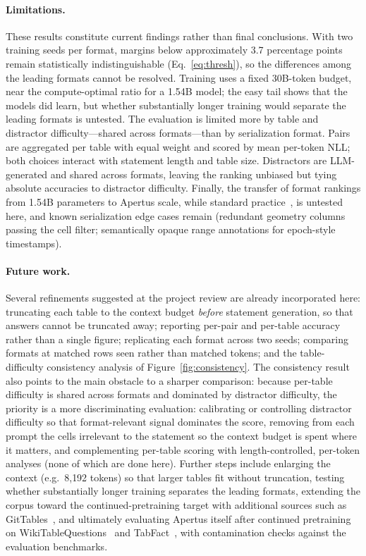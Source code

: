 \documentclass[11pt,a4paper]{article}
\begin{document}
\paragraph{Limitations.} These results constitute current findings rather than final conclusions. With two training seeds per format, margins below approximately 3.7 percentage points remain statistically indistinguishable (Eq.~\eqref{eq:thresh}), so the differences among the leading formats cannot be resolved. Training uses a fixed 30B-token budget, near the compute-optimal ratio for a 1.54B model; the easy tail shows that the models did learn, but whether substantially longer training would separate the leading formats is untested. The evaluation is limited more by table and distractor difficulty---shared across formats---than by serialization format. Pairs are aggregated per table with equal weight and scored by mean per-token NLL; both choices interact with statement length and table size. Distractors are LLM-generated and shared across formats, leaving the ranking unbiased but tying absolute accuracies to distractor difficulty. Finally, the transfer of format rankings from 1.54B parameters to Apertus scale, while standard practice~\cite{chinchilla}, is untested here, and known serialization edge cases remain (redundant geometry columns passing the cell filter; semantically opaque range annotations for epoch-style timestamps).
\paragraph{Future work.} Several refinements suggested at the project review are already incorporated here: truncating each table to the context budget \emph{before} statement generation, so that answers cannot be truncated away; reporting per-pair and per-table accuracy rather than a single figure; replicating each format across two seeds; comparing formats at matched rows seen rather than matched tokens; and the table-difficulty consistency analysis of Figure~\ref{fig:consistency}. The consistency result also points to the main obstacle to a sharper comparison: because per-table difficulty is shared across formats and dominated by distractor difficulty, the priority is a more discriminating evaluation: calibrating or controlling distractor difficulty so that format-relevant signal dominates the score, removing from each prompt the cells irrelevant to the statement so the context budget is spent where it matters, and complementing per-table scoring with length-controlled, per-token analyses (none of which are done here). Further steps include enlarging the context (e.g.\ 8{,}192 tokens) so that larger tables fit without truncation, testing whether substantially longer training separates the leading formats, extending the corpus toward the continued-pretraining target with additional sources such as GitTables~\cite{gittables}, and ultimately evaluating Apertus itself after continued pretraining on WikiTableQuestions~\cite{wtq} and TabFact~\cite{tabfact}, with contamination checks against the evaluation benchmarks.
\end{document}
